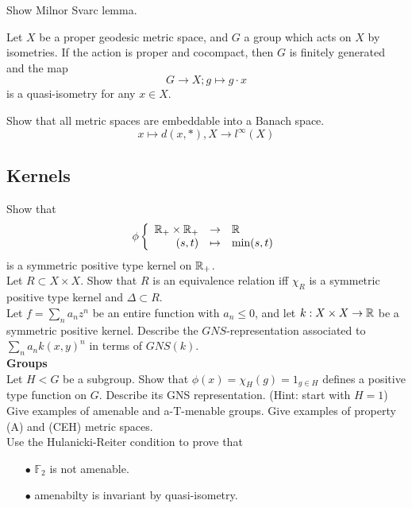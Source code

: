 Show Milnor Svarc lemma.\\

\begin{thm}
Let $X$ be a proper geodesic metric space, and $G$ a group which acts on $X$ by isometries. If the action is proper and cocompact, then $G$ is finitely generated and the map
\[G \rightarrow X ; g\mapsto g\cdot x\]
is a quasi-isometry for any $x\in X$.
\end{thm}

Show that all metric spaces are embeddable into a Banach space. 
\[x\mapsto d(x, *), X\rightarrow l^\infty (X)\]

\subsection{Kernels}

Show that \[\phi \left\{\begin{array}{rcl} \mathbb R_+ \times \mathbb R_+ & \rightarrow & \mathbb R \\ (s,t) & \mapsto & \min(s,t)\end{array}\right.\]
is a symmetric positive type kernel on $\mathbb R_+$.\\

Let $R\subset X\times X$. Show that $R$ is an equivalence relation iff $\chi_R$ is a symmetric positive type kernel and $\Delta\subset R$.\\
 
Let $f=\sum_n a_n z^n$ be an entire function with $a_n\leq 0$, and let $k: X\times X\rightarrow \mathbb R$ be a symmetric positive kernel. Describe the $GNS$-representation associated to $\sum_n a_n k(x,y)^n$ in terms of $GNS(k)$.\\

\textbf{Groups} \\

Let $H<G$ be a subgroup. Show that $\phi(x)=\chi_H(g)= 1_{g\in H}$ defines a positive type function on $G$. Describe its GNS representation. (Hint: start with $H=1$)\\

Give examples of amenable and a-T-menable groups. Give examples of property (A) and (CEH) metric spaces.\\ 

Use the Hulanicki-Reiter condition to prove that
\begin{itemize}
\item[$\bullet$] $\mathbb F_2$ is not amenable.
\item[$\bullet$] amenabilty is invariant by quasi-isometry.	
\end{itemize}

